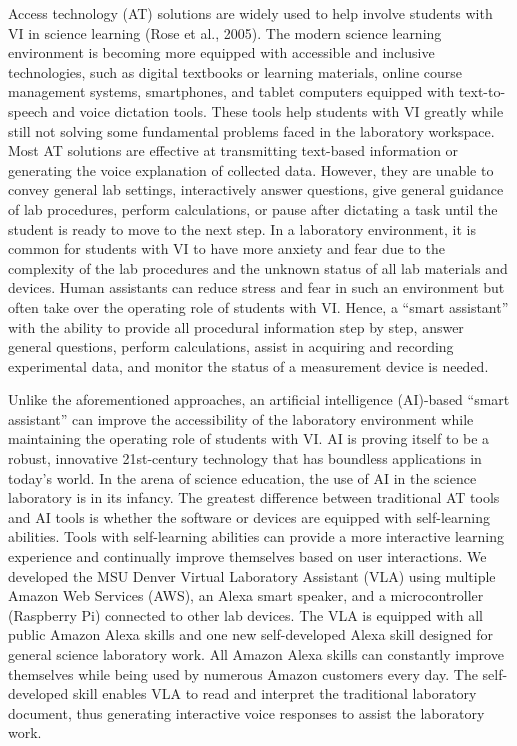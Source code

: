 \documentclass[11.5pt]{sig-alternate} %
\begin{document}
\begin{large}
Access technology (AT) solutions are widely used to help involve students with VI in science learning (Rose et al., 2005). The modern science learning environment is becoming more equipped with accessible and inclusive technologies, such as digital textbooks or learning materials, online course management systems, smartphones, and tablet computers equipped with text-to-speech and voice dictation tools. These tools help students with VI greatly while still not solving some fundamental problems faced in the laboratory workspace. Most AT solutions are effective at transmitting text-based information or generating the voice explanation of collected data. However, they are unable to convey general lab settings, interactively answer questions, give general guidance of lab procedures, perform calculations, or pause after dictating a task until the student is ready to move to the next step. In a laboratory environment, it is common for students with VI to have more anxiety and fear due to the complexity of the lab procedures and the unknown status of all lab materials and devices. Human assistants can reduce stress and fear in such an environment but often take over the operating role of students with VI. Hence, a “smart assistant” with the ability to provide all procedural information step by step, answer general questions, perform calculations, assist in acquiring and recording experimental data, and monitor the status of a measurement device is needed. 

Unlike the aforementioned approaches, an artificial intelligence (AI)-based “smart assistant” can improve the accessibility of the laboratory environment while maintaining the operating role of students with VI. AI is proving itself to be a robust, innovative 21st-century technology that has boundless applications in today's world. In the arena of science education, the use of AI in the science laboratory is in its infancy. The greatest difference between traditional AT tools and AI tools is whether the software or devices are equipped with self-learning abilities. Tools with self-learning abilities can provide a more interactive learning experience and continually improve themselves based on user interactions. We developed the MSU Denver Virtual Laboratory Assistant (VLA) using multiple Amazon Web Services (AWS), an Alexa smart speaker, and a microcontroller (Raspberry Pi) connected to other lab devices. The VLA is equipped with all public Amazon Alexa skills and one new self-developed Alexa skill designed for general science laboratory work. All Amazon Alexa skills can constantly improve themselves while being used by numerous Amazon customers every day. The self-developed skill enables VLA to read and interpret the traditional laboratory document, thus generating interactive voice responses to assist the laboratory work. 


\end{large}
\end{document}
